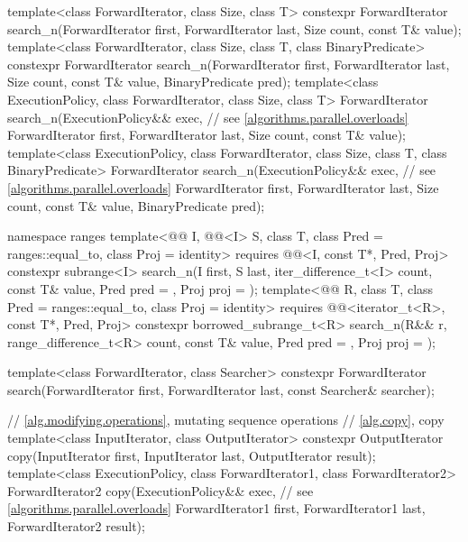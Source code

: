 \begin{codeblock}
{  template<class ForwardIterator, class Size, class T>
    constexpr ForwardIterator
      search_n(ForwardIterator first, ForwardIterator last,
               Size count, const T& value);
  template<class ForwardIterator, class Size, class T, class BinaryPredicate>
    constexpr ForwardIterator
      search_n(ForwardIterator first, ForwardIterator last,
               Size count, const T& value,
               BinaryPredicate pred);
  template<class ExecutionPolicy, class ForwardIterator, class Size, class T>
    ForwardIterator
      search_n(ExecutionPolicy&& exec,                          // see \ref{algorithms.parallel.overloads}
               ForwardIterator first, ForwardIterator last,
               Size count, const T& value);
  template<class ExecutionPolicy, class ForwardIterator, class Size, class T,
           class BinaryPredicate>
    ForwardIterator
      search_n(ExecutionPolicy&& exec,                          // see \ref{algorithms.parallel.overloads}
               ForwardIterator first, ForwardIterator last,
               Size count, const T& value,
               BinaryPredicate pred);

  namespace ranges {
    template<@@ I, @@<I> S, class T,
             class Pred = ranges::equal_to, class Proj = identity>
      requires @@<I, const T*, Pred, Proj>
      constexpr subrange<I>
        search_n(I first, S last, iter_difference_t<I> count,
                 const T& value, Pred pred = {}, Proj proj = {});
    template<@@ R, class T, class Pred = ranges::equal_to,
             class Proj = identity>
      requires @@<iterator_t<R>, const T*, Pred, Proj>
      constexpr borrowed_subrange_t<R>
        search_n(R&& r, range_difference_t<R> count,
                 const T& value, Pred pred = {}, Proj proj = {});
  }

  template<class ForwardIterator, class Searcher>
    constexpr ForwardIterator
      search(ForwardIterator first, ForwardIterator last, const Searcher& searcher);

  // \ref{alg.modifying.operations}, mutating sequence operations
  // \ref{alg.copy}, copy
  template<class InputIterator, class OutputIterator>
    constexpr OutputIterator copy(InputIterator first, InputIterator last,
                                  OutputIterator result);
  template<class ExecutionPolicy, class ForwardIterator1, class ForwardIterator2>
    ForwardIterator2 copy(ExecutionPolicy&& exec,               // see \ref{algorithms.parallel.overloads}
                          ForwardIterator1 first, ForwardIterator1 last,
                          ForwardIterator2 result);

}
\end{codeblock}
